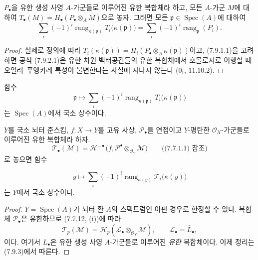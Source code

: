 \begin{proposition}[7.9.2]
\label{III.7.9.2.fr}
$P_\bullet$을 유한 생성 사영 $A$-가군들로 이루어진 유한 복합체라 하고,
모든 $A$-가군 $M$에 대하여
$T_\bullet(M)=H_\bullet(P_\bullet\otimes_A M)$으로 놓자. 그러면 모든
$\mathfrak p\in\operatorname{Spec}(A)$에 대하여
\[
  \sum_i(-1)^i\operatorname{rang}_{\kappa(\mathfrak p)}
  T_i\bigl(\kappa(\mathfrak p)\bigr)
  =\sum_i(-1)^i\operatorname{rang}_{\mathfrak p}(P_i).
  \tag{7.9.2.1}\label{III.7.9.2.1.fr}
\]
\end{proposition}

\begin{proof}
실제로 정의에 따라
$T_i(\kappa(\mathfrak p))=H_i(P_\bullet\otimes_A\kappa(\mathfrak p))$이고,
(7.9.1.1)을 고려하면 공식 (7.9.2.1)은 유한 차원 벡터공간들의 유한
복합체에서 호몰로지로 이행할 때 오일러--푸앵카레 특성이 불변한다는
사실에 지나지 않는다 ($0_{\mathrm I}$, 11.10.2).
\end{proof}

\begin{corollary}[7.9.3]
\label{III.7.9.3.fr}
함수
\[
  \mathfrak p\longmapsto
  \sum_i(-1)^i\operatorname{rang}_{\kappa(\mathfrak p)}
  T_i\bigl(\kappa(\mathfrak p)\bigr)
\]
는 $\operatorname{Spec}(A)$에서 국소 상수이다.
\end{corollary}

\begin{theorem}[7.9.4]
\label{III.7.9.4.fr}
$Y$를 국소 뇌터 준스킴, $f:X\to Y$를 고유 사상,
$\mathscr P_\bullet$을 연접이고 $Y$-평탄한 $\mathscr O_X$-가군들로
이루어진 유한 복합체라 하자.
\[
  \mathscr T_\bullet(\mathscr M)
  =\mathscr H^{-\bullet}
  \bigl(f,\mathscr P^\bullet\otimes_{\mathscr O_Y}\mathscr M\bigr)
  \qquad\text{((7.7.1.1) 참조)}
\]
로 놓으면 함수

\[
  y\longmapsto
  \sum_i(-1)^i\operatorname{rang}_{\kappa(y)}
  \mathscr T_i\bigl(\kappa(y)\bigr)
  \tag{7.9.4.1}\label{III.7.9.4.1.fr}
\]
는 $Y$에서 국소 상수이다.
\end{theorem}

\begin{proof}
$Y=\operatorname{Spec}(A)$가 뇌터 환 $A$의 스펙트럼인 아핀 경우로
한정할 수 있다. 복합체 $\mathscr P_\bullet$은 유한하므로 (7.7.12,
(i))에 따라
\[
  \mathscr T_p(\mathscr M)
  =\mathscr H_p(\mathscr L_\bullet\otimes_{\mathscr O_Y}\mathscr M),
  \qquad \mathscr L_\bullet=\widetilde{L_\bullet},
\]
이다. 여기서 $L_\bullet$은 유한 생성 사영 $A$-가군들로 이루어진
\emph{유한} 복합체이다. 이제 정리는 (7.9.3)에서 따른다.
\end{proof}

